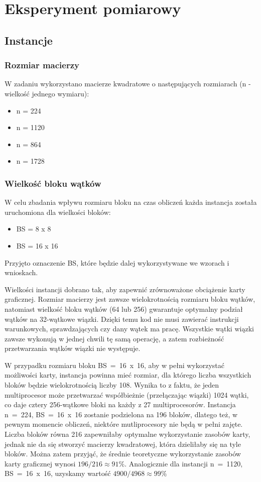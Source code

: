\documentclass[12pt,a4paper]{article}
\begin{document}
\section{Eksperyment pomiarowy}

\subsection{Instancje}

\subsubsection*{Rozmiar macierzy}
W zadaniu wykorzystano macierze kwadratowe o następujących rozmiarach (n - wielkość jednego wymiaru):
\begin{itemize}
\item n = 224
\item n = 1120
\item n = 864
\item n = 1728
\end{itemize}

\subsubsection*{Wielkość bloku wątków}

W celu zbadania wpływu rozmiaru bloku na czas obliczeń każda instancja została uruchomiona dla wielkości bloków:
\begin{itemize}
\item BS = 8 x 8
\item BS = 16 x 16
\end{itemize}
{\footnotesize Przyjęto oznaczenie BS, które będzie dalej wykorzystywane we wzorach i wnioskach.}

Wielkości instancji dobrano tak, aby zapewnić zrównoważone obciążenie karty graficznej. Rozmiar macierzy jest zawsze wielokrotnością rozmiaru bloku wątków, natomiast wielkość bloku wątków (64 lub 256) gwarantuje optymalny podział wątków na 32-wątkowe wiązki. Dzięki temu kod nie musi zawierać instrukcji warunkowych, sprawdzających czy dany wątek ma pracę. Wszystkie wątki wiązki zawsze wykonują w jednej chwili tę samą operację, a zatem rozbieżność przetwarzania wątków wiązki nie występuje.

W przypadku rozmiaru bloku BS~=~16~x~16, aby w pełni wykorzystać możliwości karty, instancja powinna mieć rozmiar, dla którego liczba wszystkich bloków będzie wielokrotnością liczby 108. Wynika to z faktu, że jeden multiprocesor może przetwarzać współbieżnie (przełączając wiązki) 1024 wątki, co daje cztery 256-wątkowe bloki na każdy z 27 multiprocesorów. Instancja  n~=~224, BS~=~16~x~16 zostanie podzielona na 196 bloków, dlatego też, w pewnym momencie obliczeń, niektóre mutliprocesory nie będą w pełni zajęte. Liczba bloków równa 216 zapewniłaby optymalne wykorzystanie zasobów karty, jednak nie da się stworzyć macierzy kwadratowej, która dzieliłaby się na tyle bloków. Można zatem przyjąć, że średnie teoretyczne wykorzystanie zasobów karty graficznej wynosi $196 / 216 \approx 91\% $. Analogicznie dla instancji  n~=~1120, BS~=~16~x~16, uzyskamy wartość $4900 / 4968 \approx 99\% $
\end{document}
